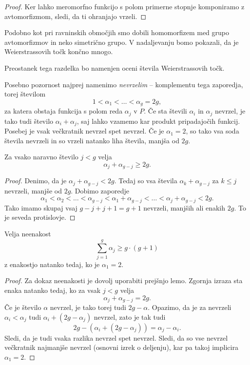 \begin{proof}
Ker lahko meromorfno funkcijo s polom primerne stopnje komponiramo
z avtomorfizmom, sledi, da ti ohranjajo vrzeli.
\end{proof}

Podobno kot pri ravninskih območjih smo dobili homomorfizem med
grupo avtomorfizmov in neko simetrično grupo. V nadaljevanju bomo
pokazali, da je Weierstrassovih točk končno mnogo.

Preostanek tega razdelka bo namenjen oceni števila Weierstrassovih
točk.

Posebno pozornost najprej namenimo \emph{nevrzelim} -- komplementu
tega zaporedja, torej številom
\[
1 < \alpha_1 < \dots < \alpha_g = 2g,
\]
za katera obstaja funkcija s polom reda $\alpha_j$ v $P$. Če sta
števili $\alpha_i$ in $\alpha_j$ nevrzel, je tako tudi število
$\alpha_i + \alpha_j$, saj lahko vzamemo kar produkt pripadajočih
funkcij. Posebej je vsak večkratnik nevrzel spet nevrzel. Če je
$\alpha_1 = 2$, so tako vsa soda števila nevrzeli in so vrzeli
natanko liha števila, manjša od $2g$.

\begin{lema}
Za vsako naravno število $j < g$ velja
\[
\alpha_j + \alpha_{g-j} \geq 2g.
\]
\end{lema}

\begin{proof}
Denimo, da je $\alpha_j + \alpha_{g-j} < 2g$. Tedaj so vsa števila
$\alpha_k + \alpha_{g-j}$ za $k \leq j$ nevrzeli, manjše od $2g$.
Dobimo zaporedje
\[
\alpha_1 < \alpha_2 < \dots < \alpha_{g-j} <
\alpha_1 + \alpha_{g-j} < \dots < \alpha_j + \alpha_{g-j} < 2g.
\]
Tako imamo skupaj vsaj $g-j + j + 1 = g + 1$ nevrzeli, manjših ali
enakih $2g$. To je seveda protislovje.
\end{proof}

\begin{lema}
\label{lm:nongap_ineq}
Velja neenakost
\[
\sum_{j=1}^{g} \alpha_j \geq g \cdot(g+1)
\]
z enakostjo natanko tedaj, ko je $\alpha_1 = 2$.
\end{lema}

\begin{proof}
Za dokaz neenakosti je dovolj uporabiti prejšnjo lemo. Zgornja
izraza sta enaka natanko tedaj, ko za vsak $j < g$ velja
\[
\alpha_j + \alpha_{g-j} = 2g.
\]
Če je število $\alpha$ nevrzel, je tako torej tudi $2g - \alpha$.
Opazimo, da je za nevrzeli $\alpha_i < \alpha_j$ tudi
$\alpha_i + (2g - \alpha_j)$ nevrzel, zato je tak tudi
\[
2g - (\alpha_i + (2g - \alpha_j)) = \alpha_j - \alpha_i.
\]
Sledi, da je tudi vsaka razlika nevrzel spet nevrzel. Sledi, da
so vse nevrzel večkratnik najmanjše nevrzel (osnovni izrek o
deljenju), kar pa takoj implicira $\alpha_1 = 2$.
\end{proof}

